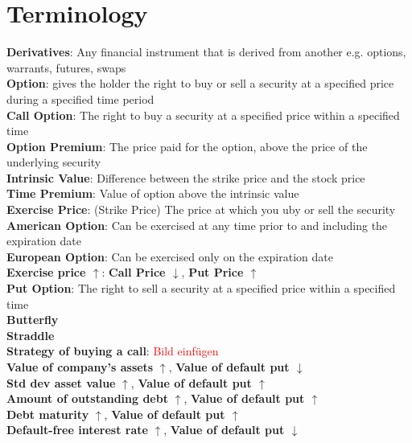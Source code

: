 \documentclass{cheatsheet}
\author{ehaller, seyohnp}
\begin{document}
\section*{Terminology}
    \textbf{Derivatives}: Any financial instrument that is derived from another e.g. options, warrants, futures, swaps\\
    \textbf{Option}: gives the holder the right to buy or sell a security at a specified price during a specified time period\\        \textbf{Call Option}: The right to buy a security at a specified price within a specified time\\
    \textbf{Option Premium}: The price paid for the option, above the price of the underlying security\\
    \textbf{Intrinsic Value}: Difference between the strike price and the stock price\\
    \textbf{Time Premium}: Value of option above the intrinsic value\\
    \textbf{Exercise Price}: (Strike Price) The price at which you uby or sell the security\\
    \textbf{American Option}: Can be exercised at any time prior to and including the expiration date\\
    \textbf{European Option}: Can be exercised only on the expiration date\\
    \textbf{Exercise price $\uparrow$}: \textbf{Call Price $\downarrow$}, \textbf{Put Price $\uparrow$}\\  
    \textbf{Put Option}: The right to sell a security at a specified price within a specified time\\
    \textbf{Butterfly}\\
    \textbf{Straddle}\\
    \textbf{Strategy of buying a call}: \textcolor{red}{Bild einfügen}\\
    \textbf{Value of company's assets} \textbf{$\uparrow$}, \textbf{Value of default put $\downarrow$}\\
    \textbf{Std dev asset value} \textbf{$\uparrow$}, \textbf{Value of default put $\uparrow$}\\
    \textbf{Amount of outstanding debt} \textbf{$\uparrow$}, \textbf{Value of default put $\uparrow$}\\
    \textbf{Debt maturity} \textbf{$\uparrow$}, \textbf{Value of default put $\uparrow$}\\
    \textbf{Default-free interest rate} \textbf{$\uparrow$}, \textbf{Value of default put $\downarrow$}\\
\end{document}
